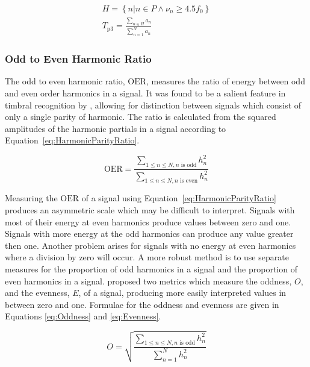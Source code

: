 			\begin{gather}
				H = \left\{ n | n \in P \land \nu_{n} \geq 4.5f_{0} \right\} \nonumber \\
				T_{\mathrm{p}3} = \frac{\sum_{n \in H} a_{n}}{\sum_{n = 1}^{N} a_{n}}
				\label{eq:PeakTristimulus3}
			\end{gather}

		\subsubsection*{Odd to Even Harmonic Ratio}
			The odd to even harmonic ratio, $\mathrm{OER}$, measures the ratio of energy between odd and even
			order harmonics in a signal. It was found to be a salient feature in timbral recognition by
			\citet{hall2010importance}, allowing for distinction between signals which consist of only a single
			parity of harmonic. The ratio is calculated from the squared amplitudes of the harmonic partials in
			a signal according to Equation~\ref{eq:HarmonicParityRatio}.
			
			\begin{equation}
				\mathrm{OER} = \frac{\sum_{1 \leq n \leq N, n \text{ is odd}} h_{n}^{2}}
					       {\sum_{1 \leq n \leq N, n \text{ is even}} h_{n}^{2}}
				\label{eq:HarmonicParityRatio}
			\end{equation}

			Measuring the $\mathrm{OER}$ of a signal using Equation~\ref{eq:HarmonicParityRatio} produces an
			asymmetric scale which may be difficult to interpret.  Signals with most of their energy at even
			harmonics produce values between zero and one.  Signals with more energy at the odd harmonics can
			produce any value greater then one. Another problem arises for signals with no energy at even
			harmonics where a division by zero will occur. A more robust method is to use separate measures for
			the proportion of odd harmonics in a signal and the proportion of even harmonics in a signal.
			\citet{lukasik2005towards} proposed two metrics which measure the oddness, $O$, and the evenness,
			$E$, of a signal, producing more easily interpreted values in between zero and one. Formulae for
			the oddness and evenness are given in Equations \ref{eq:Oddness} and \ref{eq:Evenness}.

			\begin{equation}
				O = \sqrt{\frac{\sum_{1 \leq n \leq N, n \text{ is odd}} h_{n}^{2}}
					       {\sum_{n = 1}^{N} h_{n}^{2}}}
				\label{eq:Oddness}
			\end{equation}

